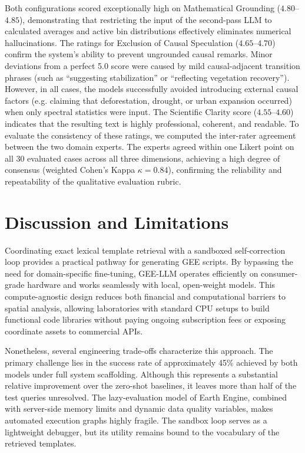 \documentclass[pdflatex,sn-mathphys-ay]{sn-jnl}
\begin{document}
Both configurations scored exceptionally high on Mathematical Grounding ($4.80$--$4.85$), demonstrating that restricting the input of the second-pass LLM to calculated averages and active bin distributions effectively eliminates numerical hallucinations. The ratings for Exclusion of Causal Speculation ($4.65$--$4.70$) confirm the system's ability to prevent ungrounded causal remarks. Minor deviations from a perfect 5.0 score were caused by mild causal-adjacent transition phrases (such as ``suggesting stabilization'' or ``reflecting vegetation recovery''). However, in all cases, the models successfully avoided introducing external causal factors (e.g. claiming that deforestation, drought, or urban expansion occurred) when only spectral statistics were input. The Scientific Clarity score ($4.55$--$4.60$) indicates that the resulting text is highly professional, coherent, and readable. To evaluate the consistency of these ratings, we computed the inter-rater agreement between the two domain experts. The experts agreed within one Likert point on all 30 evaluated cases across all three dimensions, achieving a high degree of consensus (weighted Cohen's Kappa $\kappa = 0.84$), confirming the reliability and repeatability of the qualitative evaluation rubric.

\section{Discussion and Limitations}\label{sec:discussion}

Coordinating exact lexical template retrieval with a sandboxed self-correction loop provides a practical pathway for generating GEE scripts. By bypassing the need for domain-specific fine-tuning, GEE-LLM operates efficiently on consumer-grade hardware and works seamlessly with local, open-weight models. This compute-agnostic design reduces both financial and computational barriers to spatial analysis, allowing laboratories with standard CPU setups to build functional code libraries without paying ongoing subscription fees or exposing coordinate assets to commercial APIs.

Nonetheless, several engineering trade-offs characterize this approach. The primary challenge lies in the success rate of approximately 45\% achieved by both models under full system scaffolding. Although this represents a substantial relative improvement over the zero-shot baselines, it leaves more than half of the test queries unresolved. The lazy-evaluation model of Earth Engine, combined with server-side memory limits and dynamic data quality variables, makes automated execution graphs highly fragile. The sandbox loop serves as a lightweight debugger, but its utility remains bound to the vocabulary of the retrieved templates.
\end{document}
